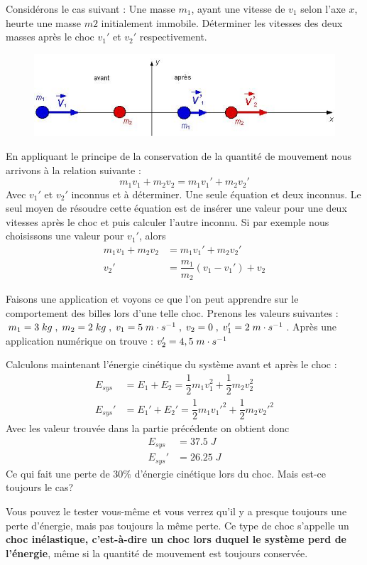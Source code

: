 \documentclass[11pt,a4paper]{article}
\begin{document}
Considérons le cas suivant : Une masse $m_1$, ayant une vitesse de $v_1$ selon l'axe $x$, heurte une masse $m2$ initialement immobile. Déterminer les vitesses des deux masses après le choc $v_1'$ et $v_2'$ respectivement. 
\begin{figure}[h]
    \centering
    \includegraphics[width=0.8\linewidth]{imgs/p2/choc1.jpg}
\end{figure}
En appliquant le principe de la conservation de la quantité de mouvement nous arrivons à la relation suivante : 
\[   m_1v_1 + m_2v_2 = m_1v_1' + m_2v_2'     \]
Avec $v_1'$ et $v_2'$ inconnus et à déterminer. Une seule équation et deux inconnus. Le seul moyen de résoudre cette équation est de insérer une valeur pour une deux vitesses après le choc et puis calculer l'autre inconnu. Si par exemple nous choisissons une valeur pour $v_1'$, alors 
\begin{align*}
    m_1v_1 + m_2v_2 &= m_1v_1' + m_2v_2' \\
    v_2' &= \dfrac{m_1}{m_2}(v_1 - v_1') + v_2
\end{align*}

Faisons une application et voyons ce que l'on peut apprendre sur le comportement des billes lors d'une telle choc. Prenons les valeurs suivantes : $m_1 = 3\; kg\;,\; m_2=2\; kg\;,\; v_1 = 5\; m\cdot s^{-1} \;,\; v_2=0\;,\; v_1'=2\; m\cdot s^{-1}$. Après une application numérique on trouve : $v_2' = 4,5\; m\cdot s^{-1} $

Calculons maintenant l'énergie cinétique du système avant et après le choc : 
\begin{align*}
    E_{sys} &= E_1 + E_2 = \dfrac{1}{2}m_1v_1^2 + \dfrac{1}{2}m_2v_2^2 \\
    E_{sys}' &= E_1' + E_2' = \dfrac{1}{2}m_1{v_1'}^2 + \dfrac{1}{2}m_2{v_2'}^2 
\end{align*}
Avec les valeur trouvée dans la partie précédente on obtient donc 
\begin{align*}
    E_{sys} &= 37.5\; J \\
    E_{sys}' &= 26.25\; J 
\end{align*}
Ce qui fait une perte de $30 \%$ d'énergie cinétique lors du choc. Mais est-ce toujours le cas? 

Vous pouvez le tester vous-même et vous verrez qu'il y a presque toujours une perte d'énergie, mais pas toujours la même perte. Ce type de choc s'appelle un \textbf{choc inélastique, c'est-à-dire un choc lors duquel le système perd de l'énergie}, même si la quantité de mouvement est toujours conservée. 
\end{document}

